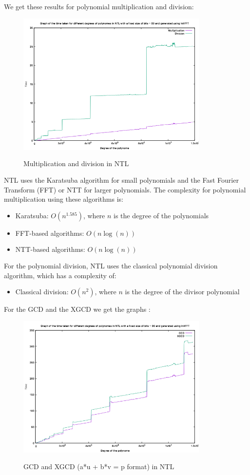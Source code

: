 We get these results for polynomial multiplication and division:

\begin{figure}[H]
    \centering
    \includegraphics[width=0.85\textwidth]{figures/ntl_mult_div.png}
    \label{fig2}
    \caption{Multiplication and division in NTL}
\end{figure}
NTL uses the Karatsuba algorithm for small polynomials and the Fast Fourier Transform (FFT) or NTT for larger polynomials. The complexity for polynomial multiplication using these algorithms is:
\begin{itemize}
    \item Karatsuba: $O(n^{1.585})$, where $n$ is the degree of the polynomials
    \item FFT-based algorithms: $O(n\log(n))$
    \item NTT-based algorithms: $O(n\log(n))$
\end{itemize}
For the polynomial division, NTL uses the classical polynomial division algorithm, which has a complexity of:
\begin{itemize}
    \item Classical division: $O(n^2)$, where $n$ is the degree of the divisor polynomial
\end{itemize}

For the GCD and the XGCD we get the graphs :
\begin{figure}[H]
    \centering
    \includegraphics[width=0.85\textwidth]{figures/ntl_gcd_xgcd.png}
    \label{fig2}
    \caption{GCD and XGCD (a*u + b*v = p format) in NTL}
\end{figure}

